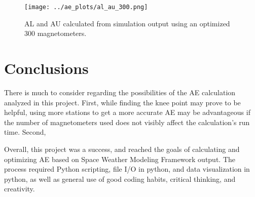\documentclass[12pt, letterpaper]{article}
\begin{document}
\begin{figure}[!ht]
  \centering
  \texttt{[image: ../ae\_plots/al\_au\_300.png]}
  \caption{AL and AU calculated from simulation output using an optimized 300 magnetometers.}
  \label{fig:alau300}
\end{figure}

\section{Conclusions} \label{conc}

There is much to consider regarding the possibilities of the AE calculation analyzed in this project. First, while finding the knee point may prove to be helpful, using more stations to get a more accurate AE may be advantageous if the number of magnetometers used does not visibly affect the calculation's run time. Second, 

Overall, this project was a success, and reached the goals of calculating and optimizing AE based on Space Weather Modeling Framework output. The process required Python scripting, file I/O in python, and data visualization in python, as well as general use of good coding habits, critical thinking, and creativity.
\end{document}
